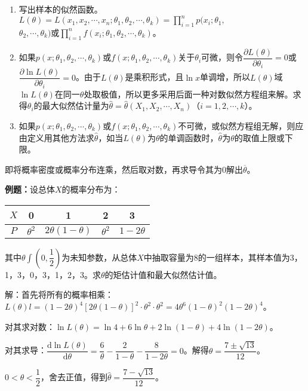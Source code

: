 \documentclass[UTF8, 12pt]{ctexart}
\begin{document}
\begin{enumerate}
    \item 写出样本的似然函数。$L(\theta)=L(x_1,x_2,\cdots,x_n;\theta_1,\theta_2,\cdots,\theta_k)=\prod\limits_{i=1}^np(x_i;\theta_1,$\\$\theta_2,\cdots,\theta_k)$或$\prod\limits_{i=1}^nf(x_i;\theta_1,\theta_2,\cdots,\theta_k)$。
    \item 如果$p(x;\theta_1,\theta_2,\cdots,\theta_k)$或$f(x;\theta_1,\theta_2,\cdots,\theta_k)$关于$\theta_i$可微，则令$\dfrac{\partial L(\theta)}{\partial\theta_i}=0$或$\dfrac{\partial\ln L(\theta)}{\partial\theta_i}=0$。由于$L(\theta)$是乘积形式，且$\ln x$单调增，所以$L(\theta)$域$\ln L(\theta)$在同一$\theta$处取极值，所以更多采用后面一种对数似然方程组来解。求得$\theta_i$的最大似然估计量为$\hat{\theta}=\hat{\theta}(X_1,X_2,\cdots,X_n)$（$i=1,2,\cdots,k$）。
    \item 如果$p(x;\theta_1,\theta_2,\cdots,\theta_k)$或$f(x;\theta_1,\theta_2,\cdots,\theta_k)$不可微，或似然方程组无解，则应由定义用其他方法求$\hat{\theta}$，如当$L(\theta)$为$\theta$的单调函数时，$\hat{\theta}$为$\theta$的取值上限或下限。
\end{enumerate}

即将概率密度或概率分布连乘，然后取对数，再求导令其为0解出$\overline{\theta}$。

\textbf{例题：}设总体$X$的概率分布为：

\begin{tabular}{c|cccc}
    \hline
    $X$ & 0 & 1 & 2 & 3 \\ \hline
    $P$ & $\theta^2$ & $2\theta(1-\theta)$ & $\theta^2$ & $1-2\theta$ \\ \hline
\end{tabular} \medskip

其中$\theta\int\left(0,\dfrac{1}{2}\right)$为未知参数，从总体$X$中抽取容量为8的一组样本，其样本值为3，1，3，0，3，1，2，3。求$\theta$的矩估计值和最大似然估计值。

解：首先将所有的概率相乘：$L(\theta)l=(1-2\theta)^4[2\theta(1-\theta)]^2\cdot\theta^2\cdot\theta^2=4\theta^6(1-\theta)^2(1-2\theta)^4$。

对其求对数：$\ln L(\theta)=\ln4+6\ln\theta+2\ln(1-\theta)+4\ln(1-2\theta)$。

对其求导：$\dfrac{\textrm{d}\ln L(\theta)}{\textrm{d}\theta}=\dfrac{6}{\theta}-\dfrac{2}{1-\theta}-\dfrac{8}{1-2\theta}=0$。解得$\theta=\dfrac{7\pm\sqrt{13}}{12}$。

$0<\theta<\dfrac{1}{2}$，舍去正值，得到$\hat{\theta}=\dfrac{7-\sqrt{13}}{12}$。
\end{document}

